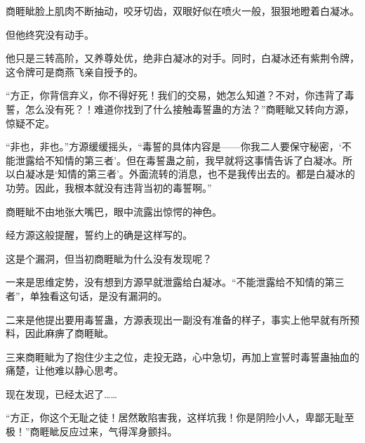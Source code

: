 \begin{this_body}
商睚眦脸上肌肉不断抽动，咬牙切齿，双眼好似在喷火一般，狠狠地瞪着白凝冰。

但他终究没有动手。

他只是三转高阶，又养尊处优，绝非白凝冰的对手。同时，白凝冰还有紫荆令牌，这令牌可是商燕飞亲自授予的。

“方正，你背信弃义，你不得好死！我们的交易，她怎么知道？不对，你违背了毒誓，怎么没有死？！难道你找到了什么接触毒誓蛊的方法？”商睚眦又转向方源，惊疑不定。

“非也，非也。”方源缓缓摇头，“毒誓的具体内容是——你我二人要保守秘密，‘不能泄露给不知情的第三者’。但在毒誓蛊之前，我早就将这事情告诉了白凝冰。所以白凝冰是‘知情的第三者’。外面流转的消息，也不是我传出去的。都是白凝冰的功劳。因此，我根本就没有违背当初的毒誓啊。”

商睚眦不由地张大嘴巴，眼中流露出惊愕的神色。

经方源这般提醒，誓约上的确是这样写的。

这是个漏洞，但当初商睚眦为什么没有发现呢？

一来是思维定势，没有想到方源早就泄露给白凝冰。“不能泄露给不知情的第三者”，单独看这句话，是没有漏洞的。

二来是他提出要用毒誓蛊，方源表现出一副没有准备的样子，事实上他早就有所预料，因此麻痹了商睚眦。

三来商睚眦为了抱住少主之位，走投无路，心中急切，再加上宣誓时毒誓蛊抽血的痛楚，让他难以静心思考。

现在发现，已经太迟了……

“方正，你这个无耻之徒！居然敢陷害我，这样坑我！你是阴险小人，卑鄙无耻至极！”商睚眦反应过来，气得浑身颤抖。

\end{this_body}

